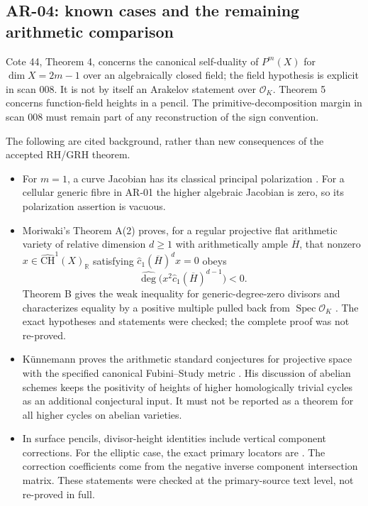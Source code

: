 \subsection{AR-04: known cases and the remaining arithmetic comparison}
\label{ar:known}

Cote 44, Theorem 4, concerns the canonical self-duality of $P^m(X)$ for
$\dim X=2m-1$ over an algebraically closed field; the field hypothesis is
explicit in scan 008.  It is not by itself an Arakelov statement over
$\mathcal O_K$.  Theorem 5 concerns function-field heights in a pencil.
The primitive-decomposition margin in scan 008 must remain part of any
reconstruction of the sign convention.

The following are cited background, rather than new consequences of the
accepted RH/GRH theorem.
\begin{itemize}
\item For $m=1$, a curve Jacobian has its classical principal polarization
\cite[Theorem 6.6 and Summary 6.11]{MilneJacobian}.
For a cellular generic fibre in AR-01 the higher algebraic Jacobian is zero,
so its polarization assertion is vacuous.
\item Moriwaki's Theorem A(2) proves, for a regular projective flat
arithmetic variety of relative dimension $d\ge1$ with arithmetically ample
$\overline H$, that nonzero $x\in\widehat{\mathrm{CH}}^1(X)_{\mathbb R}$
satisfying $\widehat c_1(\overline H)^d x=0$ obeys
\[
 \widehat{\deg}\bigl(x^2\widehat c_1(\overline H)^{d-1}\bigr)<0.
\]
Theorem B gives the weak inequality for generic-degree-zero divisors and
characterizes equality by a positive multiple pulled back from
$\operatorname{Spec}\mathcal O_K$ \cite[Theorems A and B]{Moriwaki}.
The exact hypotheses and statements were checked; the complete proof was
not re-proved.
\item K\"unnemann proves the arithmetic standard conjectures for projective
space with the specified canonical Fubini--Study metric
\cite[Theorem 4.1]{Kunnemann}.  His discussion of abelian schemes keeps
the positivity of heights of higher homologically trivial cycles as an
additional conjectural input.  It must not be reported as a theorem for all
higher cycles on abelian varieties.
\item In surface pencils, divisor-height identities include vertical
component corrections.  For the elliptic case, the exact primary locators
are \cite[Lemma 8.1, Theorems 8.4 and 8.6, equations (8.8), (8.11)--(8.14)]{Shioda}.
The correction coefficients come from the negative inverse component
intersection matrix.  These statements were checked at the primary-source
text level, not re-proved in full.
\end{itemize}

